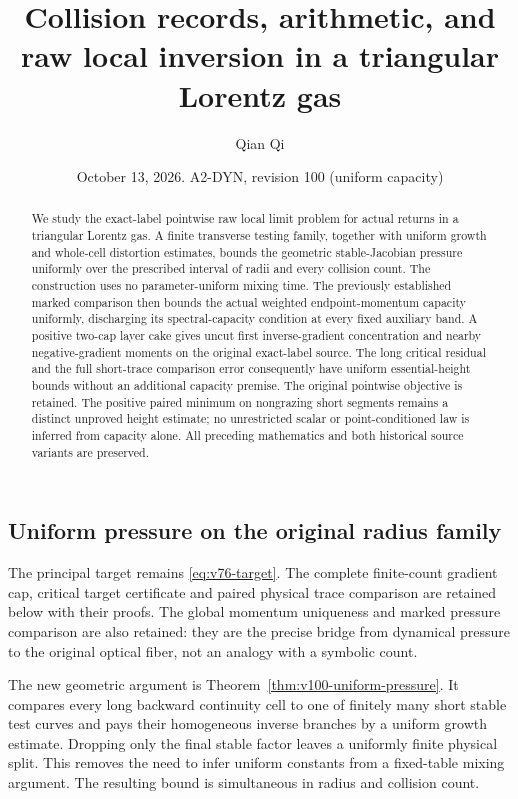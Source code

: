 \documentclass[11pt,reqno]{amsart}
\title[Collision records and raw local inversion]{Collision records, arithmetic, and raw local inversion in a triangular Lorentz gas}
\author{Qian Qi}
\date{October 13, 2026. A2-DYN, revision 100 (uniform capacity)}
\numberwithin{equation}{section}
\theoremstyle{definition}
\theoremstyle{remark}\newtheorem{remark}[theorem]{Remark}
\begin{document}
\raggedbottom
\begin{abstract}
We study the exact-label pointwise raw local limit problem for actual
returns in a triangular Lorentz gas. A finite transverse testing family,
together with uniform growth and whole-cell distortion estimates,
bounds the geometric stable-Jacobian pressure uniformly over the
prescribed interval of radii and every collision count. The construction
uses no parameter-uniform mixing time. The previously established
marked comparison then bounds the actual weighted endpoint-momentum
capacity uniformly, discharging its spectral-capacity condition at
every fixed auxiliary band. A positive two-cap layer cake gives uncut
first inverse-gradient concentration and nearby negative-gradient
moments on the original exact-label source. The long critical residual
and the full short-trace comparison error consequently have uniform
essential-height bounds without an additional capacity premise.
The original pointwise objective is retained. The positive paired
minimum on nongrazing short segments remains a distinct unproved
height estimate; no unrestricted scalar or point-conditioned law is
inferred from capacity alone. All preceding mathematics and both
historical source variants are preserved.
\end{abstract}
\maketitle


\subsection{Uniform pressure on the original radius family}
The principal target remains \eqref{eq:v76-target}. The complete
finite-count gradient cap, critical target certificate and paired
physical trace comparison are retained below with their proofs.
The global momentum uniqueness and marked pressure comparison are
also retained: they are the precise bridge from dynamical pressure
to the original optical fiber, not an analogy with a symbolic count.

The new geometric argument is Theorem~\ref{thm:v100-uniform-pressure}.
It compares every long backward continuity cell to one of finitely
many short stable test curves and pays their homogeneous inverse
branches by a uniform growth estimate. Dropping only the final stable
factor leaves a uniformly finite physical split. This removes the
need to infer uniform constants from a fixed-table mixing argument.
The resulting bound is simultaneous in radius and collision count.
\end{document}
